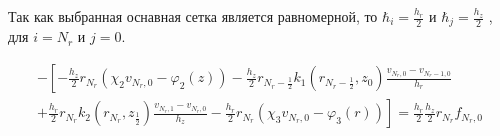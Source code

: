Так как выбранная оснавная сетка является равномерной, то $ \hbar_i =\frac{h_r}{2}$ и $ \hbar_j = \frac{h_z}{2}$
, для $ i = N_r $ и $ j = 0 $.

\begin{align*}
  - \left [ 
  -\frac{h_z}{2} r_{N_r} (\chi_2 v_{N_r, 0} - \varphi_2(z) )
  - \frac{h_z}{2} r_{N_r-\frac{1}{2}} k_1(r_{N_r-\frac{1}{2}}, z_0) \frac{v_{N_r, 0} - v_{N_r - 1, 0}}{h_{r}}
  \right . \\
  \left .
  + \frac{h_r}{2} r_{N_r} k_2(r_{N_r}, z_{\frac{1}{2}}) \frac{v_{N_r, 1} - v_{N_r, 0}}{h_{z}}
  - \frac{h_r}{2} r_{N_r} (\chi_3 v_{N_r, 0} - \varphi_3(r))
  \right ]  = \frac{h_r}{2} \frac{h_z}{2} r_{N_r} f_{N_r, 0}
\end{align*}